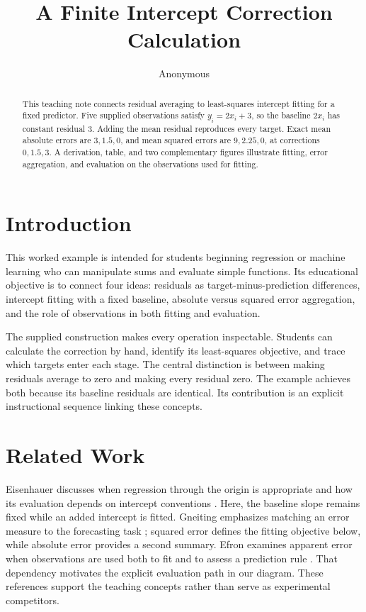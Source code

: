 \documentclass[11pt]{article}
\title{A Finite Intercept Correction Calculation}
\author{Anonymous}
\date{}
\begin{document}
\maketitle

\begin{abstract}
This teaching note connects residual averaging to least-squares intercept fitting for a fixed predictor. Five supplied observations satisfy $y_i=2x_i+3$, so the baseline $2x_i$ has constant residual $3$. Adding the mean residual reproduces every target. Exact mean absolute errors are $3,1.5,0$, and mean squared errors are $9,2.25,0$, at corrections $0,1.5,3$. A derivation, table, and two complementary figures illustrate fitting, error aggregation, and evaluation on the observations used for fitting.
\end{abstract}

\section{Introduction}

This worked example is intended for students beginning regression or machine learning who can manipulate sums and evaluate simple functions. Its educational objective is to connect four ideas: residuals as target-minus-prediction differences, intercept fitting with a fixed baseline, absolute versus squared error aggregation, and the role of observations in both fitting and evaluation.

The supplied construction makes every operation inspectable. Students can calculate the correction by hand, identify its least-squares objective, and trace which targets enter each stage. The central distinction is between making residuals average to zero and making every residual zero. The example achieves both because its baseline residuals are identical. Its contribution is an explicit instructional sequence linking these concepts.

\section{Related Work}

Eisenhauer discusses when regression through the origin is appropriate and how its evaluation depends on intercept conventions \cite{Eisenhauer2003RegressionThrough}. Here, the baseline slope remains fixed while an added intercept is fitted. Gneiting emphasizes matching an error measure to the forecasting task \cite{Gneiting2011MakingEvaluating}; squared error defines the fitting objective below, while absolute error provides a second summary. Efron examines apparent error when observations are used both to fit and to assess a prediction rule \cite{Efron1986HowBiased}. That dependency motivates the explicit evaluation path in our diagram. These references support the teaching concepts rather than serve as experimental competitors.
\end{document}
